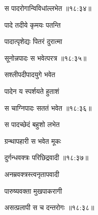 {\devanagarifontbold स पादरोगान्विविधांल्लभेत {॥१८:३४॥} \veg\dontdisplaylinenum }%
 
\ujvers{}

\nemslokab

{\devanagarifontbold पादे तदीये कृमयः पतन्ति  \danda\dontdisplaylinenum }%
 
\nemslokac

{\devanagarifontbold पादात्पृशेद्यः पितरं दुरात्मा }%
  \dontdisplaylinenum

\nemslokad

{\devanagarifontbold सूनोन्नपादः स भवेत्परत्र {॥१८:३५॥} \veg\dontdisplaylinenum }%
 
\ujvers{}

\nemslokab

{\devanagarifontbold सश्लीपदीपादयुगे भवेत  \danda\dontdisplaylinenum }%
 
\nemslokac

{\devanagarifontbold पादेन य स्पर्शयते हुताशं }%
  \dontdisplaylinenum

\nemslokad

{\devanagarifontbold स चाग्निपादः सततं भवेत {॥१८:३६॥} \veg\dontdisplaylinenum }%
 
\ujvers{}

\nemslokab

{\devanagarifontbold स पादच्छेदं बहुशो लभेत  \danda\dontdisplaylinenum }%
 
\nemslokac

{\devanagarifontbold ग्रन्थापहारी स भवेत मूकः }%
  \dontdisplaylinenum

\nemslokad

{\devanagarifontbold दुर्गन्धवक्त्रः परिछिद्रवादी {॥१८:३७॥} \veg\dontdisplaylinenum }%
 
\ujvers{}

\nemslokab

{\devanagarifontbold अनम्रवक्त्रस्त्वनृतापवादी  \danda\dontdisplaylinenum }%
 
\nemslokac

{\devanagarifontbold पारुष्यवक्ता मुखपाकरागी }%
  \dontdisplaylinenum

\nemslokad

{\devanagarifontbold असत्प्रलापी स च दन्तरोगः {॥१८:३८॥} \veg\dontdisplaylinenum }%
 
